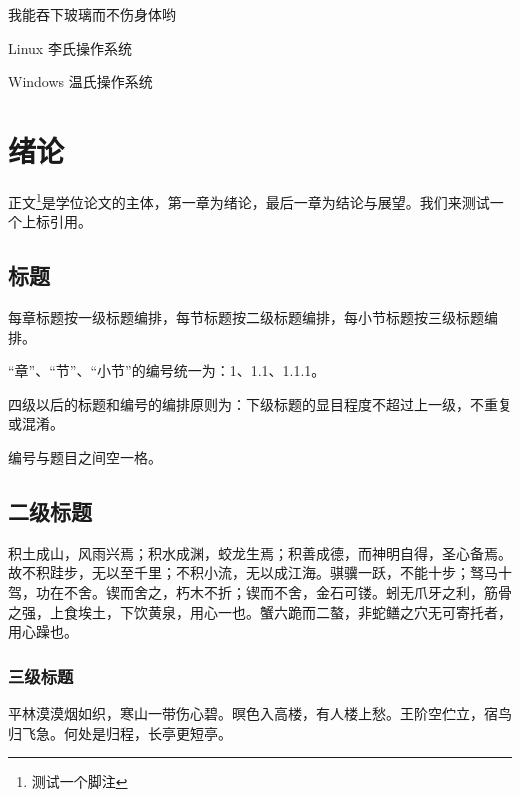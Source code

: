 \documentclass[
    bachelor, 
    ]{xjtuthesis}
\begin{document}
    \clearpage

    \xjtucontent

    \begin{denotation}

      \item[\xjtuthesis]    我能吞下玻璃而不伤身体哟
      \item[Linux]          李氏操作系统
      \item[Windows]        温氏操作系统

    \end{denotation}


    \chapter{绪论}

        正文\footnote{测试一个脚注}是学位论文的主体，第一章为绪论，最后一章为结论与展望。我们来测试一个上标引用\supercite{niubi-paper}。
        
        \section{标题}

        每章标题按一级标题编排，每节标题按二级标题编排，每小节标题按三级标题编排。

        “章”、“节”、“小节”的编号统一为：1、1.1、1.1.1。

        四级以后的标题和编号的编排原则为：下级标题的显目程度不超过上一级，不重复或混淆。

        编号与题目之间空一格。


        \section{二级标题}


            积土成山，风雨兴焉；积水成渊，蛟龙生焉；积善成德，而神明自得，圣心备焉。故不积跬步，无以至千里；不积小流，无以成江海。骐骥一跃，不能十步；驽马十驾，功在不舍。锲而舍之，朽木不折；锲而不舍，金石可镂。蚓无爪牙之利，筋骨之强，上食埃土，下饮黄泉，用心一也。蟹六跪而二螯，非蛇鳝之穴无可寄托者，用心躁也。 

            \subsection{三级标题}

            平林漠漠烟如织，寒山一带伤心碧。暝色入高楼，有人楼上愁。王阶空伫立，宿鸟归飞急。何处是归程，长亭更短亭。
\end{document}

